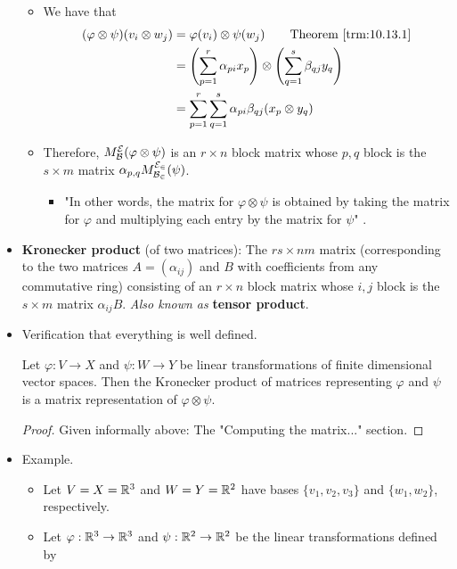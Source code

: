 \documentclass[../notes.tex]{subfiles}
\begin{document}
\begin{itemize}
\begin{itemize}
\begin{equation*}
        \end{equation*}
        \item We have that
        \begin{align*}
            (\varphi\otimes\psi)(v_i\otimes w_j) &= \varphi(v_i)\otimes\psi(w_j)\tag*{Theorem \ref{trm:10.13.1}}\\
            &= \left( \sum_{p=1}^r\alpha_{pi}x_p \right)\otimes\left( \sum_{q=1}^s\beta_{qj}y_q \right)\\
            &= \sum_{p=1}^r\sum_{q=1}^s\alpha_{pi}\beta_{qj}(x_p\otimes y_q)
        \end{align*}
        \item Therefore, $M_\mathcal{B}^\mathcal{E}(\varphi\otimes\psi)$ is an $r\times n$ block matrix whose $p,q$ block is the $s\times m$ matrix $\alpha_{p,q}M_\mathcal{B_2}^\mathcal{E_2}(\psi)$.
        \begin{itemize}
            \item "In other words, the matrix for $\varphi\otimes\psi$ is obtained by taking the matrix for $\varphi$ and multiplying each entry by the matrix for $\psi$" \parencite[421]{bib:DummitFoote}.
        \end{itemize}
    \end{itemize}
    \item \textbf{Kronecker product} (of two matrices): The $rs\times nm$ matrix (corresponding to the two matrices $A=(\alpha_{ij})$ and $B$ with coefficients from any commutative ring) consisting of an $r\times n$ block matrix whose $i,j$ block is the $s\times m$ matrix $\alpha_{ij}B$. \emph{Also known as} \textbf{tensor product}.
    \item Verification that everything is well defined.
    \begin{proposition}\label{prp:11.17}
        Let $\varphi:V\to X$ and $\psi:W\to Y$ be linear transformations of finite dimensional vector spaces. Then the Kronecker product of matrices representing $\varphi$ and $\psi$ is a matrix representation of $\varphi\otimes\psi$.
        \begin{proof}
            Given informally above: The "Computing the matrix..." section.
        \end{proof}
    \end{proposition}
    \item Example.
    \begin{itemize}
        \item Let $V=X=\mathbb{R}^3$ and $W=Y=\mathbb{R}^2$ have bases $\{v_1,v_2,v_3\}$ and $\{w_1,w_2\}$, respectively.
        \item Let $\varphi:\mathbb{R}^3\to\mathbb{R}^3$ and $\psi:\mathbb{R}^2\to\mathbb{R}^2$ be the linear transformations defined by

\end{itemize}
\end{itemize}
\end{document}
